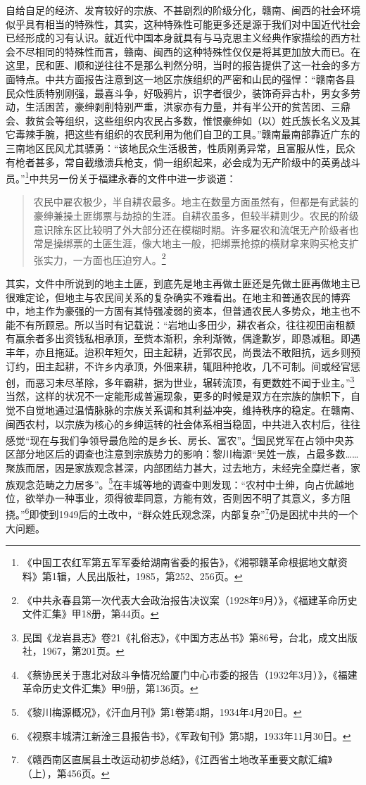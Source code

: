 自给自足的经济、发育较好的宗族、不甚剧烈的阶级分化，赣南、闽西的社会环境似乎具有相当的特殊性，其实，这种特殊性可能更多还是源于我们对中国近代社会已经形成的习有认识。就近代中国本身就具有与马克思主义经典作家描绘的西方社会不尽相同的特殊性而言，赣南、闽西的这种特殊性仅仅是将其更加放大而已。在这里，民和匪、顺和逆往往不是那么判然分明，当时的报告提供了这一社会的多方面特点。中共方面报告注意到这一地区宗族组织的严密和山民的强悍：“赣南各县民众性质特别刚强，最喜斗争，好吸鸦片，识字者很少，装饰奇异古朴，男女多劳动，生活困苦，豪绅剥削特别严重，洪家亦有力量，并有半公开的贫苦团、三鼎会、救贫会等组织，这些组织内农民占多数，惟恨豪绅如（以）姓氏族长名义及其它毒辣手腕，把这些有组织的农民利用为他们自卫的工具。”赣南最南部靠近广东的三南地区民风尤其骠勇：“该地民众生活极苦，性质刚勇异常，且富服从性，民众有枪者甚多，常自截缴溃兵枪支，倘一组织起来，必会成为无产阶级中的英勇战斗员。”\footnote{《中国工农红军第五军军委给湖南省委的报告》，《湘鄂赣革命根据地文献资料》第1辑，人民出版社，1985，第252、256页。}中共另一份关于福建永春的文件中进一步谈道：

\begin{quote}

农民中雇农极少，半自耕农最多。地主在数量方面虽然有，但都是有武装的豪绅兼操土匪绑票与劫掠的生涯。自耕农虽多，但较半耕则少。农民的阶级意识除东区比较明了外大部分还在模糊时期。许多雇农和流氓无产阶级者也常是操绑票的土匪生涯，像大地主一般，把绑票抢掠的横财拿来购买枪支扩张实力，一方面也压迫穷人。\footnote{《中共永春县第一次代表大会政治报告决议案（1928年9月）》，《福建革命历史文件汇集》甲18册，第44页。}
\end{quote}


其实，文件中所说到的地主土匪，到底先是地主再做土匪还是先做土匪再做地主已很难定论，但地主与农民间关系的复杂确实不难看出。在地主和普通农民的博弈中，地主作为豪强的一方固有其恃强凌弱的资本，但普通农民人多势众，地主也不能不有所顾忌。所以当时有记载说：“岩地山多田少，耕农者众，往往视田亩租额有赢余者多出资钱私相承顶，至赀本渐积，余利渐微，偶逢歉岁，即恳减租。即遇丰年，亦且拖延。迨积年短欠，田主起耕，近郭农民，尚畏法不敢阻抗，远乡则预订约，田主起耕，不许乡内承顶，外佃来耕，辄阻种抢收，几不可制。间或经官惩创，而恶习未尽革除，多年霸耕，据为世业，辗转流顶，有更数姓不闻于业主。”\footnote{民国《龙岩县志》卷21《礼俗志》，《中国方志丛书》第86号，台北，成文出版社，1967，第201页。}当然，这样的状况不一定能形成普遍现象，更多的时候是双方在宗族的旗帜下，自觉不自觉地通过温情脉脉的宗族关系调和其利益冲突，维持秩序的稳定。在赣南、闽西农村，以宗族为核心的乡绅运转的社会体系相当稳固，中共进入农村后，往往感觉“现在与我们争领导最危险的是乡长、房长、富农”。\footnote{《蔡协民关于惠北对敌斗争情况给厦门中心市委的报告（1932年3月）》，《福建革命历史文件汇集》甲9册，第136页。}国民党军在占领中央苏区部分地区后的调查也注意到宗族势力的影响：黎川梅源“吴姓一族，占最多数……聚族而居，因是家族观念甚深，内部团结力甚大，过去地方，未经完全糜烂者，家族观念范畴之力居多”。\footnote{《黎川梅源概况》，《汗血月刊》第1卷第4期，1934年4月20日。}在丰城等地的调查中则发现：“农村中士绅，向占优越地位，欲举办一种事业，须得彼辈同意，方能有效，否则因不明了其意义，多方阻挠。”\footnote{《视察丰城清江新淦三县报告书》，《军政旬刊》第5期，1933年11月30日。}即使到1949后的土改中，“群众姓氏观念深，内部复杂”\footnote{《赣西南区直属县土改运动初步总结》，《江西省土地改革重要文献汇编》（上），第456页。}仍是困扰中共的一个大问题。


